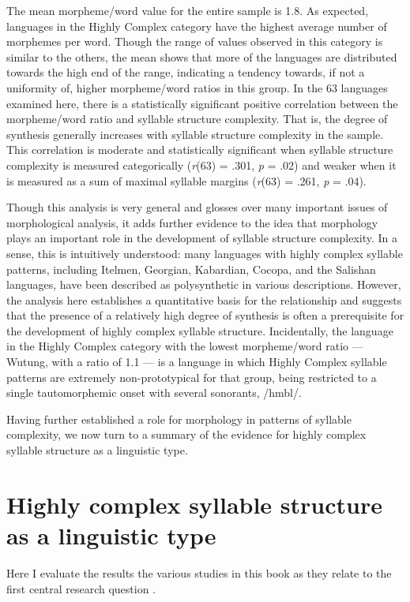   The mean morpheme/word value for the entire sample is 1.8. As expected, languages in the Highly Complex category have the highest average number of morphemes per word. Though the range of values observed in this category is similar to the others, the mean shows that more of the languages are distributed towards the high end of the range, indicating a tendency towards, if not a uniformity of, higher morpheme/word ratios in this group. In the 63 languages examined here, there is a statistically significant positive correlation between the morpheme/word ratio and syllable structure complexity. That is, the degree of synthesis generally increases with syllable structure complexity in the sample. This correlation is moderate and statistically significant when syllable structure complexity is measured categorically (\textit{r}(63) = .301, \textit{p} = .02) and weaker when it is measured as a sum of maximal syllable margins (\textit{r}(63) = .261, \textit{p} = .04).

  Though this analysis is very general and glosses over many important issues of morphological analysis, it adds further evidence to the idea that morphology plays an important role in the development of syllable structure complexity. In a sense, this is intuitively understood: many languages with highly complex syllable patterns, including Itelmen, Georgian, Kabardian, Cocopa, and the Salishan languages, have been described as polysynthetic in various descriptions. However, the analysis here establishes a quantitative basis for the relationship and suggests that the presence of a relatively high degree of synthesis is often a prerequisite for the development of highly complex syllable structure. Incidentally, the language in the Highly Complex category with the lowest morpheme/word ratio — Wutung, with a ratio of 1.1 — is a language in which Highly Complex syllable patterns are extremely non-prototypical for that group, being restricted to a single tautomorphemic onset with several sonorants, /hmbl/.

  Having further established a role for morphology in patterns of syllable complexity, we now turn to a summary of the evidence for highly complex syllable structure as a linguistic type.

\section{Highly complex syllable structure as a linguistic type}\label{sec:8.3}

  Here I evaluate the results the various studies in this book as they relate to the first central research question .

